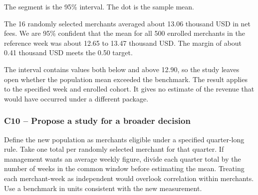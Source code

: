 	\noindent
	\begin{minipage}[t]{0.44\textwidth}
	\vspace{0pt}
	\centering

	The segment is the 95\% interval. The dot is the sample mean.
	\end{minipage}
	\hfill
	\begin{minipage}[t]{0.52\textwidth}
	\vspace{0pt}
	The 16 randomly selected merchants averaged about 13.06 thousand USD in net fees. We are 95\% confident that the mean for all 500 enrolled merchants in the reference week was about 12.65 to 13.47 thousand USD. The margin of about 0.41 thousand USD meets the 0.50 target.

	The interval contains values both below and above 12.90, so the study leaves open whether the population mean exceeded the benchmark. The result applies to the specified week and enrolled cohort. It gives no estimate of the revenue that would have occurred under a different package.
	\end{minipage}


	\label{sol:c10-3-b}
	\subsubsection*{C10 -- Propose a study for a broader decision}

	Define the new population as merchants eligible under a specified quarter-long rule. Take one total per randomly selected merchant for that quarter. If management wants an average weekly figure, divide each quarter total by the number of weeks in the common window before estimating the mean. Treating each merchant-week as independent would overlook correlation within merchants. Use a benchmark in units consistent with the new measurement.





